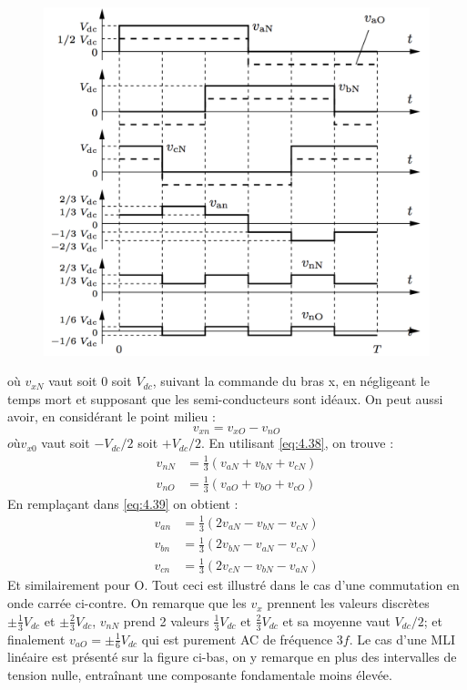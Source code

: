 	 \begin{figure}
		\vspace{-5mm}
		\includegraphics[scale=0.28]{ch4/24}
		\end{figure}
		où $v_{xN}$ vaut soit 0 soit $V_{dc}$, suivant la commande du bras x, en négligeant le temps mort et supposant que les semi-conducteurs sont idéaux. On peut aussi avoir, en considérant le point milieu :
	 \begin{equation}
	 	v_{xn} = v_{xO} - v_{nO}
	\end{equation}	  
	$où v_{x0}$ vaut soit $-V_{dc}/2$ soit $+V_{dc}/2$. En utilisant \eqref{eq:4.38}, on trouve :
	\begin{equation}
	\begin{aligned}
	v_{nN} &= \frac{1}{3} (v_{aN} +v_{bN}+v_{cN})\\
	v_{nO} &= \frac{1}{3} (v_{aO} +v_{bO}+v_{cO})
	\end{aligned}
	\end{equation}
	En remplaçant dans \eqref{eq:4.39} on obtient : 
	\begin{equation}
	\begin{aligned}
	v_{an} &= \frac{1}{3} (2v_{aN} -v_{bN}-v_{cN})\\
	v_{bn} &= \frac{1}{3} (2v_{bN} -v_{aN}-v_{cN})\\
	v_{cn} &= \frac{1}{3} (2v_{cN} -v_{bN}-v_{aN})
	\end{aligned}	
	\end{equation}
	Et similairement pour O. Tout ceci est illustré dans le cas d'une commutation en onde carrée ci-contre. On remarque que les $v_x$ prennent les valeurs discrètes $\pm \frac{1}{3}V_{dc}$ et $\pm \frac{2}{3}V_{dc}$, $v_{nN}$ prend 2 valeurs $ \frac{1}{3}V_{dc}$ et $\frac{2}{3}V_{dc}$ et sa moyenne vaut $V_{dc}/2$; et finalement $v_{aO}=\pm \frac{1}{6}V_{dc}$ qui est purement AC de fréquence $3f$. Le cas d'une MLI linéaire est présenté sur la figure ci-bas, on y remarque en plus des intervalles de tension nulle, entraînant une composante fondamentale moins élevée. 
	
